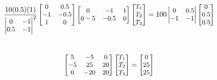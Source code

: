 \documentclass[10pt]{article}
\begin{document}
\begin{enumerate}
\begin{align*}
\small{
\frac{10(0.5)(1)}
{\begin{vmatrix}
0 & -1 \\
0.5 & -1
\end{vmatrix}^2} 
\begin{bmatrix}
0 & 0.5\\
 -1 & -0.5 \\
 1 & 0
\end{bmatrix} 
\begin{bmatrix}
0 & -1 & 1 \\
0-5 & -0.5 & 0
\end{bmatrix} 
\begin{bmatrix}
T_1 \\ T_2 \\ T_3
\end{bmatrix} = 100 
\begin{vmatrix} 0 & 0.5 \\ 
-1 & -1 \end{vmatrix} 
\begin{bmatrix} 
0 \\ 0.5 \\ 0.5
\end{bmatrix}}
\end{align*}\\
\begin{align*}
\small{
\begin{bmatrix}
5 & -5 & 0\\
-5 & 25 & 20 \\
0 & -20 & 20
\end{bmatrix}
\begin{bmatrix} 
T_1 \\ T_2 \\ T_3
\end{bmatrix} =  
\begin{bmatrix} 
0 \\ 25 \\ 25
\end{bmatrix}}
\end{align*}
\end{enumerate}
\end{document}
